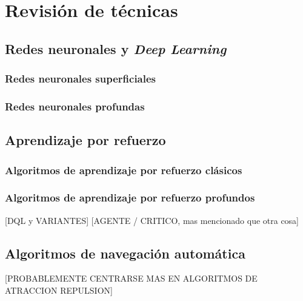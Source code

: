 \chapter{Revisión de técnicas}

\section{Redes neuronales y \textit{Deep Learning}}

\subsection{Redes neuronales superficiales}

\subsection{Redes neuronales profundas}

\section{Aprendizaje por refuerzo}

\subsection{Algoritmos de aprendizaje por refuerzo clásicos}

\subsection{Algoritmos de aprendizaje por refuerzo profundos}
[DQL y VARIANTES]
[AGENTE / CRITICO, mas mencionado que otra cosa]

\section{Algoritmos de navegación automática}
[PROBABLEMENTE CENTRARSE MAS EN ALGORITMOS DE ATRACCION REPULSION]